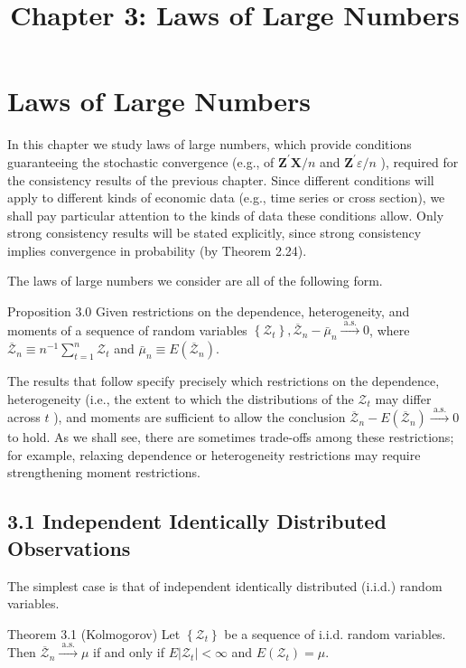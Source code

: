 \documentclass[10pt]{article}
\title{Chapter 3: Laws of Large Numbers}
\author{}
\date{}
\begin{document}
\maketitle

\section*{Laws of Large Numbers}
In this chapter we study laws of large numbers, which provide conditions guaranteeing the stochastic convergence (e.g., of $\mathbf{Z}^{\prime} \mathbf{X} / n$ and $\mathbf{Z}^{\prime} \varepsilon / n$ ), required for the consistency results of the previous chapter. Since different conditions will apply to different kinds of economic data (e.g., time series or cross section), we shall pay particular attention to the kinds of data these conditions allow. Only strong consistency results will be stated explicitly, since strong consistency implies convergence in probability (by Theorem 2.24).

The laws of large numbers we consider are all of the following form.

Proposition 3.0 Given restrictions on the dependence, heterogeneity, and moments of a sequence of random variables $\left\{\mathcal{Z}_{t}\right\}, \overline{\mathcal{Z}}_{n}-\bar{\mu}_{n} \xrightarrow{\text { a.s. }} 0$, where $\overline{\mathcal{Z}}_{n} \equiv n^{-1} \sum_{t=1}^{n} \mathcal{Z}_{t}$ and $\bar{\mu}_{n} \equiv E\left(\overline{\mathcal{Z}}_{n}\right)$.

The results that follow specify precisely which restrictions on the dependence, heterogeneity (i.e., the extent to which the distributions of the $\mathcal{Z}_{t}$ may differ across $t$ ), and moments are sufficient to allow the conclusion $\overline{\mathcal{Z}}_{n}-E\left(\overline{\mathcal{Z}}_{n}\right) \xrightarrow{\text { a.s. }} 0$ to hold. As we shall see, there are sometimes trade-offs among these restrictions; for example, relaxing dependence or heterogeneity restrictions may require strengthening moment restrictions.

\subsection*{3.1 Independent Identically Distributed Observations}
The simplest case is that of independent identically distributed (i.i.d.) random variables.

Theorem 3.1 (Kolmogorov) Let $\left\{\mathcal{Z}_{t}\right\}$ be a sequence of i.i.d. random variables. Then $\overline{\mathcal{Z}}_{n} \xrightarrow{\text { a.s. }} \mu$ if and only if $E\left|\mathcal{Z}_{t}\right|<\infty$ and $E\left(\mathcal{Z}_{t}\right)=\mu$.
\end{document}
